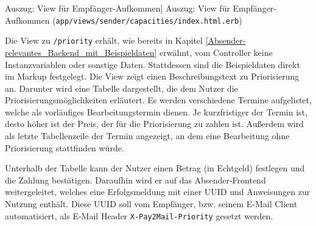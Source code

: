 \begin{listing}[!ht]
\inputminted[firstline=43, lastline=55, linenos]{erb}{Listings/Prototype/capacities_index.html.erb}

\caption
    [Auszug: View für Empfänger-Aufkommen]
    {Auszug: View für Empfänger-Aufkommen (\texttt{app/views/sender/capacities/index.html.erb})}

\label{lst:capacities/index}
\end{listing}

\noindent Die View zu \texttt{/priority} erhält, wie bereits in Kapitel \ref{Absender-relevantes_Backend_mit_Beispieldaten} erwähnt, vom Controller keine Instanzvariablen oder sonstige Daten. Stattdessen sind die Beispieldaten direkt im Markup festgelegt. Die View zeigt einen Beschreibungstext zu Priorisierung an. Darunter wird eine Tabelle dargestellt, die dem Nutzer die Priorisierungsmöglichkeiten erläutert. Es werden verschiedene Termine aufgelistet, welche als vorläufiges Bearbeitungstermin dienen. Je kurzfristiger der Termin ist, desto höher ist der Preis, der für die Priorisierung zu zahlen ist. Außerdem wird als letzte Tabellenzeile der Termin angezeigt, an dem eine Bearbeitung ohne Priorisierung stattfinden würde.

Unterhalb der Tabelle kann der Nutzer einen Betrag (in Echtgeld) festlegen und die Zahlung bestätigen. Daraufhin wird er auf das Absender-Frontend weitergeleitet, welches eine Erfolgsmeldung mit einer UUID und Anweisungen zur Nutzung enthält. Diese UUID soll vom Empfänger, bzw. seinem E-Mail Client automatisiert, als E-Mail Header \texttt{X-Pay2Mail-Priority} gesetzt werden. 